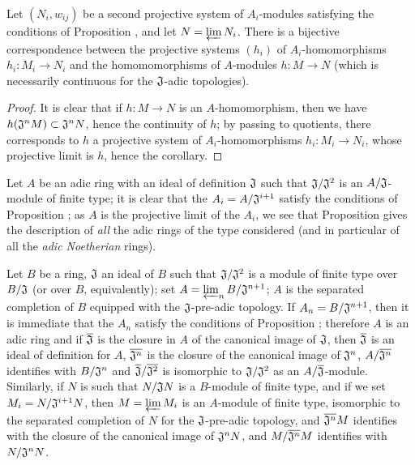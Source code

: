\begin{cor}[7.2.10]
\label{0.7.2.10}
Let $(N_i,w_{ij})$ be a second projective system of $A_i$-modules satisfying the conditions
of Proposition , and let $N=\varprojlim N_i$. There is a
bijective correspondence between the projective systems $(h_i)$ of $A_i$-homomorphisms
$h_i:M_i\to N_i$ and the homomomorphisms of $A$-modules $h:M\to N$ (which is necessarily
continuous for the $\mathfrak{J}$-adic topologies).
\end{cor}

\begin{proof}
\label{proof-0.7.2.10}
It is clear that if $h:M\to N$ is an $A$-homomorphism, then we have
$h(\mathfrak{J}^n M)\subset\mathfrak{J}^n N$, hence the continuity of $h$; by passing to
quotients, there corresponds to $h$ a projective system of $A_i$-homomorphisms
$h_i:M_i\to N_i$, whose projective limit is $h$, hence the corollary.
\end{proof}

\begin{rmk}[7.2.11]
\label{0.7.2.11}
Let $A$ be an adic ring with an ideal of definition $\mathfrak{J}$ such that
$\mathfrak{J}/\mathfrak{J}^2$ is an $A/\mathfrak{J}$-module of finite type; it is clear
that the $A_i=A/\mathfrak{J}^{i+1}$ satisfy
the conditions of Proposition ; as $A$ is the projective
limit of the $A_i$, we see that Proposition  gives the
description of \emph{all} the adic rings of the type considered (and in particular of all
the \emph{adic Noetherian} rings).
\end{rmk}

\begin{exm}[7.2.12]
\label{0.7.2.12}
Let $B$ be a ring, $\mathfrak{J}$ an ideal of $B$ such that $\mathfrak{J}/\mathfrak{J}^2$ is
a module of finite type over $B/\mathfrak{J}$ (or over $B$, equivalently); set
$A=\varprojlim_n B/\mathfrak{J}^{n+1}$; $A$ is the separated completion of $B$ equipped with
the $\mathfrak{J}$-pre-adic topology. If $A_n=B/\mathfrak{J}^{n+1}$, then it is immediate
that the $A_n$ satisfy the conditions of Proposition ;
therefore $A$ is an adic ring and if $\overline{\mathfrak{J}}$ is the closure in $A$ of the
canonical image of $\mathfrak{J}$, then $\overline{\mathfrak{J}}$ is an ideal of definition
for $A$, $\overline{\mathfrak{J}^n}$ is the closure of the canonical image of
$\mathfrak{J}^n$, $A/\overline{\mathfrak{J}^n}$ identifies with $B/\mathfrak{J}^n$ and
$\overline{\mathfrak{J}}/\overline{\mathfrak{J}^2}$ is isomorphic to
$\mathfrak{J}/\mathfrak{J}^2$ as an $A/\overline{\mathfrak{J}}$-module. Similarly, if $N$
is such that $N/\mathfrak{J}N$ is a $B$-module of finite type, and if we set
$M_i=N/\mathfrak{J}^{i+1}N$, then $M=\varprojlim M_i$ is an $A$-module of finite type,
isomorphic to the separated completion of $N$ for the $\mathfrak{J}$-pre-adic topology, and
$\overline{\mathfrak{J}^n}M$ identifies with the closure of the canonical image of
$\mathfrak{J}^n N$, and $M/\overline{\mathfrak{J}^n}M$ identifies with
$N/\mathfrak{J}^n N$.
\end{exm}

